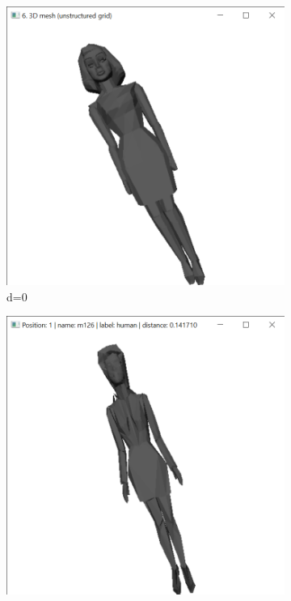 \documentclass{bigdata}
\begin{document}
\begin{figure}[h!]
  \centering
  \begin{subfigure}[b]{0.09\linewidth}
    \includegraphics[width=\linewidth]{Pictures/Evaluation/m134/m134.png}
    \caption*{d=0}
  \end{subfigure}
  \begin{subfigure}[b]{0.09\linewidth}
    \includegraphics[width=\linewidth]{Pictures/Evaluation/m134/pos1.png}

\end{subfigure}
\end{figure}
\end{document}
